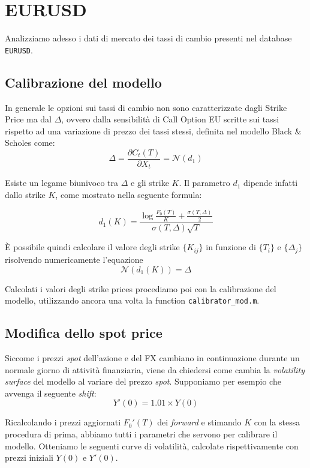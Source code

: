 \documentclass[11pt]{article}
\begin{document}
\vspace*{2cm}
\section{EURUSD}
Analizziamo adesso i dati di mercato dei tassi di cambio presenti nel database \texttt{EURUSD}. 

\subsection{Calibrazione del modello}
In generale le opzioni sui tassi di cambio non sono caratterizzate dagli Strike Price
ma dal $\Delta$, ovvero dalla sensibilità di Call Option EU scritte sui tassi rispetto ad una variazione di prezzo dei tassi stessi, definita nel modello Black \& Scholes come:
\begin{equation}
\Delta = \frac{\partial C_t(T)}{\partial X_t} = \mathcal{N}(d_1)
\end{equation}

Esiste un legame biunivoco tra $\Delta$ e gli strike $K$. Il parametro $d_1$ dipende infatti dallo strike $K$, come mostrato nella seguente formula:

\begin{equation}
d_1(K) = \frac{\log\frac{F_0(T)}{K}+ \frac{\sigma(T,\Delta)}{2}}{\sigma(T,\Delta)\sqrt{T}}
\end{equation}

\MakeUppercase{è} possibile quindi calcolare il valore degli strike $\{ K_{ij}\}$ in funzione di $\{ T_i\}$ e $\{ \Delta_j\}$ risolvendo numericamente l'equazione $$\mathcal{N}(d_1(K)) = \Delta$$

Calcolati i valori degli strike prices procediamo poi con la calibrazione del modello, utilizzando ancora una volta la function \texttt{calibrator\_mod.m}.

\subsection{Modifica dello spot price}


Siccome i prezzi \textit{spot} dell'azione e del FX cambiano in continuazione durante un normale giorno di attività finanziaria, viene da chiedersi come cambia la \textit{volatility surface} del modello al variare del prezzo \textit{spot}. Supponiamo per esempio che avvenga il seguente \textit{shift}:
$$ Y'(0) = 1.01\times Y(0)$$

Ricalcolando i prezzi aggiornati $F_0'(T)$ dei \textit{forward} e stimando $K$ con la stessa procedura di prima, abbiamo tutti i parametri che servono per calibrare il modello. Otteniamo le seguenti curve di volatilità, calcolate rispettivamente con prezzi iniziali $Y(0)$ e $Y'(0)$.\\
\end{document}
